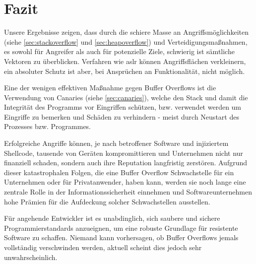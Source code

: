 \pagebreak

\section{Fazit}
Unsere Ergebnisse zeigen, dass durch die schiere Masse an Angriffsmöglichkeiten (siehe \autoref{sec:stackoverflow} und \ref*{sec:heapoverflow})
und Verteidigungsmaßnahmen, 
es sowohl für Angreifer als auch für potenzielle Ziele, schwierig ist sämtliche Vektoren zu überblicken. 
Verfahren wie \gls*{aslr} können Angriffsflächen verkleinern, ein absoluter Schutz ist aber, bei Ansprüchen an Funktionalität, nicht möglich.

Eine der wenigen effektiven Maßnahme gegen Buffer Overflows ist die Verwendung von Canaries (siehe \autoref{sec:canaries}),
welche den Stack und damit die Integrität des Programms vor Eingriffen schützen, bzw.
verwendet werden um Eingriffe zu bemerken und Schäden zu verhindern - meist durch Neustart
des Prozesses bzw. Programmes.

Erfolgreiche Angriffe können, je nach betroffener Software und injiziertem Shellcode, tausende von Geräten kompromittieren und
Unternehmen nicht nur finanziell schaden, sondern auch ihre Reputation langfristig zerstören. 
Aufgrund dieser katastrophalen Folgen, die eine Buffer Overflow Schwachstelle für ein Unternehmen oder für Privatanwender, 
haben kann, werden sie noch lange eine zentrale Rolle in der Informationssicherheit einnehmen und 
Softwareunternehmen hohe Prämien für die Aufdeckung solcher Schwachstellen ausstellen. 

Für angehende Entwickler ist es unabdinglich, sich saubere und sichere Programmierstandards anzueignen, um eine robuste Grundlage für resistente Software zu schaffen. 
Niemand kann vorhersagen, ob Buffer Overflows jemals vollständig verschwinden werden, aktuell scheint dies jedoch sehr unwahrscheinlich.

























